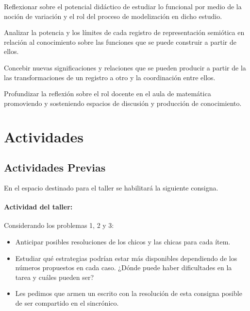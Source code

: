\documentclass[oneside,spanish]{amsart}
\numberwithin{equation}{section}
\numberwithin{figure}{section}
\theoremstyle{definition}
\begin{document}
Reflexionar sobre el potencial didáctico de estudiar lo funcional por medio de la noción de variación y el rol del proceso de modelización en dicho estudio.

Analizar la potencia y los límites de cada registro de representación semiótica en relación al conocimiento sobre las funciones que se puede construir a partir de ellos.

Concebir nuevas significaciones y relaciones que se pueden producir a partir de la las transformaciones de un registro a otro y la coordinación entre ellos.

Profundizar la reflexión sobre el rol docente en el aula de matemática promoviendo y sosteniendo espacios de discusión y producción de conocimiento.

\section{Actividades}

\subsection{Actividades Previas}

En el espacio destinado para el taller se habilitará la siguiente consigna.

\paragraph{Actividad del taller:} 
Considerando los problemas 1, 2 y 3:
\begin{itemize}[-]
	\item Anticipar posibles resoluciones de los chicos y las chicas para cada ítem. 
	\item Estudiar qué estrategias podrían estar más disponibles dependiendo de los números propuestos en cada caso. ¿Dónde puede haber dificultades en la tarea y cuáles pueden ser?
	\item Les pedimos que armen un escrito con la resolución de esta consigna posible de ser compartido en el sincrónico. 
\end{itemize}
\end{document}
